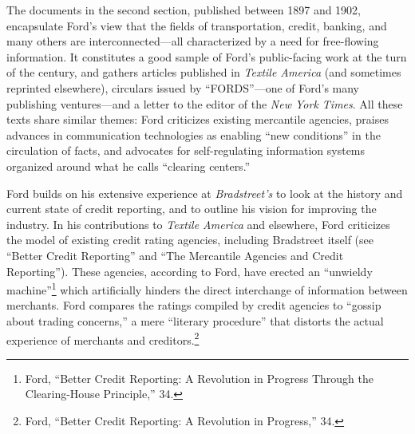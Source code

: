 \documentclass[twoside,symmetric,nobib,justified]{tufte-book}
\begin{document}
The documents in the second section, published between 1897 and 1902,
encapsulate Ford's view that the fields of transportation, credit,
banking, and many others are interconnected---all characterized by a
need for free-flowing information. It constitutes a good sample of
Ford's public-facing work at the turn of the century, and gathers
articles published in \emph{Textile America} (and sometimes reprinted
elsewhere), circulars issued by ``FORDS''---one of Ford's many
publishing ventures---and a letter to the editor of the \emph{New York
Times}. All these texts share similar themes: Ford criticizes existing
mercantile agencies, praises advances in communication technologies as
enabling ``new conditions'' in the circulation of facts, and advocates
for self-regulating information systems organized around what he calls
``clearing centers.''

Ford builds on his extensive experience at \emph{Bradstreet's} to look
at the history and current state of credit reporting, and to outline his
vision for improving the industry. In his contributions to \emph{Textile
America} and elsewhere, Ford criticizes the model of existing credit
rating agencies, including Bradstreet itself (see ``Better Credit
Reporting'' and ``The Mercantile Agencies and Credit Reporting''). These
agencies, according to Ford, have erected an ``unwieldy
machine''\footnote{Ford, ``Better Credit Reporting: A Revolution in
  Progress Through the Clearing-House Principle,'' 34.} which
artificially hinders the direct interchange of information between
merchants. Ford compares the ratings compiled by credit agencies to
``gossip about trading concerns,'' a mere ``literary procedure'' that
distorts the actual experience of merchants and creditors.\footnote{Ford,
  ``Better Credit Reporting: A Revolution in Progress,'' 34.}
\end{document}
